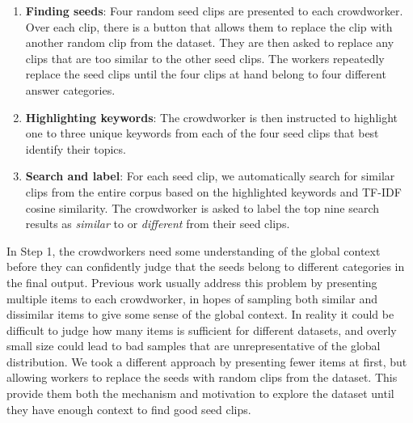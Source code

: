 \begin{enumerate}
    \setlength\itemsep{-1mm}

	\item \textbf{Finding seeds}:
    	Four random seed clips are presented to each crowdworker. Over each clip,
    	there is a button that allows them to replace the clip with another
    	random clip from the dataset.
		They are then asked to replace any clips
		that are too similar to the other seed clips.
		The workers repeatedly replace the seed clips
		until the four clips at hand belong to four different
		answer categories.
	\item \textbf{Highlighting keywords}:
	    The crowdworker is then instructed to highlight one to three
		unique keywords from each of the four seed clips that best identify
		their topics.  
	\item \textbf{Search and label}:
	    For each seed clip, we automatically search for
		similar clips from the entire corpus based on the highlighted keywords 
        and TF-IDF cosine similarity.
        The crowdworker is
		asked to label the top nine search results as \emph{similar} to or
		\emph{different} from their seed clips.
\end{enumerate}


In Step 1, the crowdworkers need some understanding of the global context before
they can confidently judge that the seeds belong to different categories
in the final output. Previous work usually address this problem by presenting multiple
items to each crowdworker, in hopes of sampling both similar and dissimilar items
to give some sense of the global context. In reality it could be difficult to
judge how many items is sufficient for different datasets, and overly small size could lead to
bad samples that are unrepresentative of the global distribution.
We took a different approach by presenting fewer items at first,
but allowing workers to replace the seeds with random clips from
the dataset. This provide them both the mechanism and motivation to explore the dataset
until they have enough context to find good seed clips.


